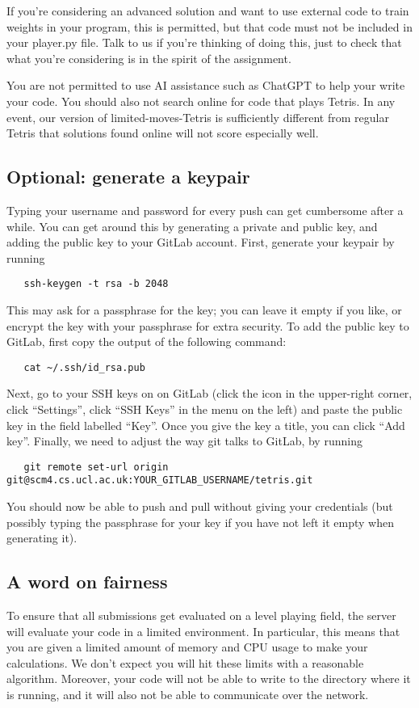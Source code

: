 \documentclass{article}
\begin{document}
If you're considering an advanced solution and want to use external
code to train weights in your program, this is permitted, but that
code must not be included in your player.py file.  Talk to us if
you're thinking of doing this, just to check that what you're
considering is in the spirit of the assignment.

You are not permitted to use AI assistance such as ChatGPT to help
your write your code.  You should also not search online for code that
plays Tetris.  In any event, our version of limited-moves-Tetris is
sufficiently different from regular Tetris that solutions found online
will not score especially well.

\subsection*{Optional: generate a keypair}
Typing your username and password for every push can get cumbersome
after a while. You can get around this by generating a private and
public key, and adding the public key to your GitLab account. First,
generate your keypair by running
\begin{verbatim}
   ssh-keygen -t rsa -b 2048
\end{verbatim}
This may ask for a passphrase for the key; you can leave it empty if
you like, or encrypt the key with your passphrase for extra
security. To add the public key to GitLab, first copy the output of
the following command:
\begin{verbatim}
   cat ~/.ssh/id_rsa.pub
\end{verbatim}
Next, go to your SSH keys on on GitLab (click the icon in the
upper-right corner, click “Settings”, click “SSH Keys” in the menu on
the left) and paste the public key in the field labelled “Key”. Once
you give the key a title, you can click “Add key”. Finally, we need to
adjust the way git talks to GitLab, by running
\begin{verbatim}
   git remote set-url origin git@scm4.cs.ucl.ac.uk:YOUR_GITLAB_USERNAME/tetris.git
\end{verbatim}
You should now be able to push and pull without giving your
credentials (but possibly typing the passphrase for your key if you
have not left it empty when generating it).

\subsection*{A word on fairness}
To ensure that all submissions get evaluated on a level playing field,
the server will evaluate your code in a limited environment. In
particular, this means that you are given a limited amount of memory
and CPU usage to make your calculations. We don’t expect you will hit
these limits with a reasonable algorithm. Moreover, your code will not
be able to write to the directory where it is running, and it will
also not be able to communicate over the network.
\end{document}

